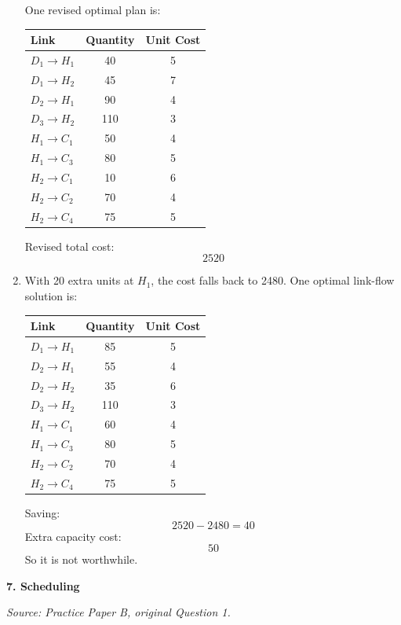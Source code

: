 \documentclass[11pt,a4paper]{article}
\begin{document}
\begin{enumerate}
One revised optimal plan is:

\begin{center}
\begin{tabular}{lcc}
\toprule
Link & Quantity & Unit Cost \\
\midrule
$D_1 \to H_1$ & 40 & 5 \\
$D_1 \to H_2$ & 45 & 7 \\
$D_2 \to H_1$ & 90 & 4 \\
$D_3 \to H_2$ & 110 & 3 \\
$H_1 \to C_1$ & 50 & 4 \\
$H_1 \to C_3$ & 80 & 5 \\
$H_2 \to C_1$ & 10 & 6 \\
$H_2 \to C_2$ & 70 & 4 \\
$H_2 \to C_4$ & 75 & 5 \\
\bottomrule
\end{tabular}
\end{center}

Revised total cost:
\[
2520
\]

\item With 20 extra units at $H_1$, the cost falls back to 2480. One optimal link-flow solution is:

\begin{center}
\begin{tabular}{lcc}
\toprule
Link & Quantity & Unit Cost \\
\midrule
$D_1 \to H_1$ & 85 & 5 \\
$D_2 \to H_1$ & 55 & 4 \\
$D_2 \to H_2$ & 35 & 6 \\
$D_3 \to H_2$ & 110 & 3 \\
$H_1 \to C_1$ & 60 & 4 \\
$H_1 \to C_3$ & 80 & 5 \\
$H_2 \to C_2$ & 70 & 4 \\
$H_2 \to C_4$ & 75 & 5 \\
\bottomrule
\end{tabular}
\end{center}

Saving:
\[
2520-2480=40
\]
Extra capacity cost:
\[
50
\]
So it is not worthwhile.
\end{enumerate}

\newpage

\textbf{7. Scheduling}

\textit{Source: Practice Paper B, original Question 1.}
\end{document}
